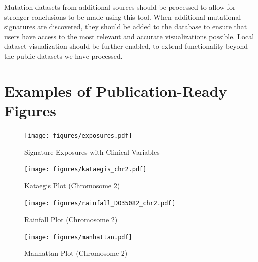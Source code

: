 \documentclass[12pt, letterpaper]{article}
\begin{document}
Mutation datasets from additional sources should be processed to allow for stronger conclusions to be made using this tool.
When additional mutational signatures are discovered, they should be added to the database to ensure that users have access to the most relevant and accurate visualizations possible.
Local dataset visualization should be further enabled, to extend functionality beyond the public datasets we have processed.


{}


\pagebreak
\appendix                                     
\section{Examples of Publication-Ready Figures}
\renewcommand{\figurename}{Example Figure}
\setcounter{figure}{0}

\begin{figure}[h!]
    \caption{Signature Exposures with Clinical Variables}
    \centering
    \texttt{[image: figures/exposures.pdf]}
\end{figure}
\begin{figure}[h!]
    \caption{Kataegis Plot (Chromosome 2)}
    \centering
    \texttt{[image: figures/kataegis\_chr2.pdf]}
\end{figure}
\begin{figure}[h!]
    \caption{Rainfall Plot (Chromosome 2)}
    \centering
    \texttt{[image: figures/rainfall\_DO35082\_chr2.pdf]}
\end{figure}
\begin{figure}[h!]
    \caption{Manhattan Plot (Chromosome 2)}
    \centering
    \texttt{[image: figures/manhattan.pdf]}
\end{figure}
\end{document}
